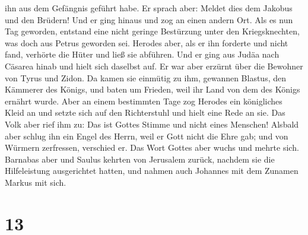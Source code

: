 ihn aus dem Gefängnis geführt habe. Er sprach aber: Meldet dies dem
Jakobus und den Brüdern! Und er ging hinaus und zog an einen andern Ort.
 Als es nun Tag geworden, entstand eine nicht geringe
Bestürzung unter den Kriegsknechten, was doch aus Petrus geworden sei.
 Herodes aber, als er ihn forderte und nicht fand,
verhörte die Hüter und ließ sie abführen. Und er ging aus Judäa nach
Cäsarea hinab und hielt sich daselbst auf.  Er war aber
erzürnt über die Bewohner von Tyrus und Zidon. Da kamen sie einmütig zu
ihm, gewannen Blastus, den Kämmerer des Königs, und baten um Frieden,
weil ihr Land von dem des Königs ernährt wurde.  Aber an
einem bestimmten Tage zog Herodes ein königliches Kleid an und setzte
sich auf den Richterstuhl und hielt eine Rede an sie. 
Das Volk aber rief ihm zu: Das ist Gottes Stimme und nicht eines
Menschen!  Alsbald aber schlug ihn ein Engel des Herrn,
weil er Gott nicht die Ehre gab; und von Würmern zerfressen, verschied
er.  Das Wort Gottes aber wuchs und mehrte sich.
 Barnabas aber und Saulus kehrten von Jerusalem zurück,
nachdem sie die Hilfeleistung ausgerichtet hatten, und nahmen auch
Johannes mit dem Zunamen Markus mit sich.

\hypertarget{section-12}{%
\section{13}\label{section-12}}

